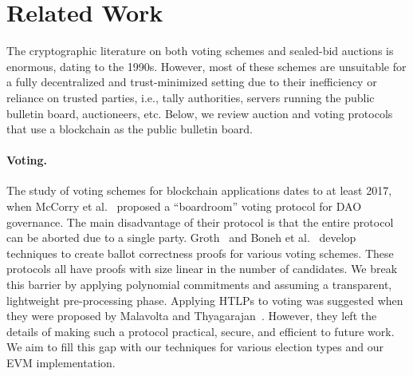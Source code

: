 \section{Related Work}

The cryptographic literature on both voting schemes and sealed-bid auctions is enormous, dating to the 1990s. However, most of these schemes are unsuitable for a fully decentralized and trust-minimized setting due to their inefficiency or reliance on trusted parties, i.e., tally authorities, servers running the public bulletin board, auctioneers, etc. Below, we review auction and voting protocols that use a blockchain as the public bulletin board. 

\paragraph{Voting.} 
The study of voting schemes for blockchain applications dates to at least 2017, when McCorry et al.~\cite{mccorry2017smart} proposed a ``boardroom'' voting protocol for DAO governance.
The main disadvantage of their protocol is that the entire protocol can be aborted due to a single party. Groth~\cite{groth2005voting} and Boneh et al.~\cite{boneh2023arithmetic} develop techniques to create ballot correctness proofs for various voting schemes. These protocols all have proofs with size linear in the number of candidates. We break this barrier by applying polynomial commitments and assuming a transparent, lightweight pre-processing phase. Applying HTLPs to voting was suggested when they were proposed by Malavolta and Thyagarajan~\cite{malavolta2019homomorphic}. However, they left the details of making such a protocol practical, secure, and efficient to future work. We aim to fill this gap with our techniques for various election types and our EVM implementation.

